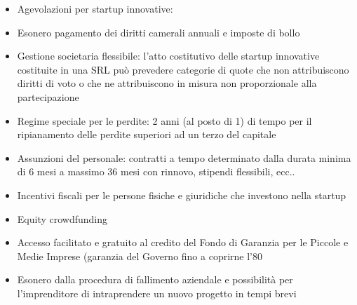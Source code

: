 \begin{itemize}
    \item Agevolazioni per startup innovative:
    \item Esonero pagamento dei diritti camerali annuali e imposte di bollo
    \item Gestione societaria flessibile: l’atto costitutivo delle startup innovative costituite in
    una SRL può prevedere categorie di quote che non attribuiscono diritti di voto o che ne
    attribuiscono in misura non proporzionale alla partecipazione
    \item Regime speciale per le perdite: 2 anni (al posto di 1) di tempo per il ripianamento
    delle perdite superiori ad un terzo del capitale
    \item Assunzioni del personale: contratti a tempo determinato dalla durata minima di 6
    mesi a massimo 36 mesi con rinnovo, stipendi flessibili, ecc..
    \item Incentivi fiscali per le persone fisiche e giuridiche che investono nella startup
    \item Equity crowdfunding
    \item Accesso facilitato e gratuito al credito del Fondo di Garanzia per le Piccole e Medie
    Imprese (garanzia del Governo fino a coprirne l'80%
    \item Esonero dalla procedura di fallimento aziendale e possibilità per l'imprenditore di
    intraprendere un nuovo progetto in tempi brevi
\end{itemize}
